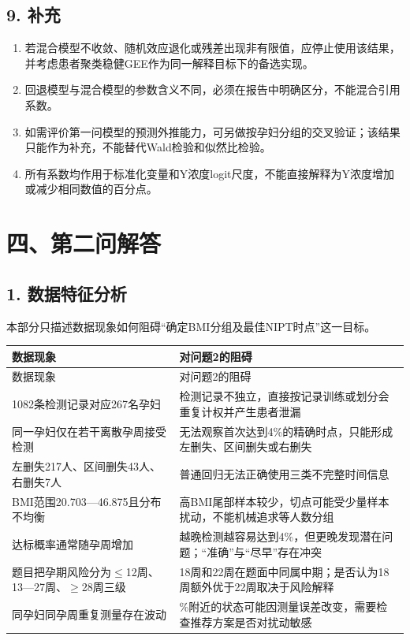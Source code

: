 \documentclass[UTF8,12pt,a4paper]{ctexart}
\begin{document}
\subsection{9. 补充}
\begin{enumerate}
\item 若混合模型不收敛、随机效应退化或残差出现非有限值，应停止使用该结果，并考虑患者聚类稳健GEE作为同一解释目标下的备选实现。
\item 回退模型与混合模型的参数含义不同，必须在报告中明确区分，不能混合引用系数。
\item 如需评价第一问模型的预测外推能力，可另做按孕妇分组的交叉验证；该结果只能作为补充，不能替代Wald检验和似然比检验。
\item 所有系数均作用于标准化变量和Y浓度logit尺度，不能直接解释为Y浓度增加或减少相同数值的百分点。
\end{enumerate}

\section{四、第二问解答}
\subsection{1. 数据特征分析}
本部分只描述数据现象如何阻碍“确定BMI分组及最佳NIPT时点”这一目标。

\begingroup
\footnotesize
\setlength{\tabcolsep}{1.5pt}
\begin{longtable}{|>{\raggedright\arraybackslash}p{}|>{\raggedright\arraybackslash}p{}|}
\hline
数据现象 & 对问题2的阻碍 \\ \hline
\endfirsthead
\hline
数据现象 & 对问题2的阻碍 \\ \hline
\endhead
1082条检测记录对应267名孕妇 & 检测记录不独立，直接按记录训练或划分会重复计权并产生患者泄漏 \\ \hline
同一孕妇仅在若干离散孕周接受检测 & 无法观察首次达到4\%的精确时点，只能形成左删失、区间删失或右删失 \\ \hline
左删失217人、区间删失43人、右删失7人 & 普通回归无法正确使用三类不完整时间信息 \\ \hline
BMI范围20.703—46.875且分布不均衡 & 高BMI尾部样本较少，切点可能受少量样本扰动，不能机械追求等人数分组 \\ \hline
达标概率通常随孕周增加 & 越晚检测越容易达到4\%，但更晚发现潜在问题；“准确”与“尽早”存在冲突 \\ \hline
题目把孕期风险分为$\leq$12周、13—27周、$\geq$28周三级 & 18周和22周在题面中同属中期；是否认为18周额外优于22周取决于风险解释 \\ \hline
同孕妇同孕周重复测量存在波动 & 4\%附近的状态可能因测量误差改变，需要检查推荐方案是否对扰动敏感 \\ \hline
\end{longtable}
\endgroup
\end{document}
